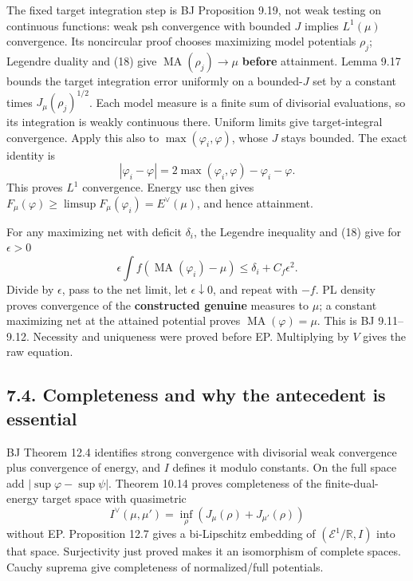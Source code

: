 \documentclass[
  11pt,
]{article}
\begin{document}
The fixed target integration step is BJ Proposition 9.19, not weak
testing on continuous functions: weak psh convergence with bounded \(J\)
implies \(L^1(\mu)\) convergence. Its noncircular proof chooses
maximizing model potentials \(\rho_j\); Legendre duality and (18) give
\(\operatorname{MA}(\rho_j)\to\mu\) \textbf{before} attainment. Lemma
9.17 bounds the target integration error uniformly on a bounded-\(J\)
set by a constant times \(J_\mu(\rho_j)^{1/2}\). Each model measure is a
finite sum of divisorial evaluations, so its integration is weakly
continuous there. Uniform limits give target-integral convergence. Apply
this also to \(\max(\varphi_i,\varphi)\), whose \(J\) stays bounded. The
exact identity is
\[|\varphi_i-\varphi|=2\max(\varphi_i,\varphi)-\varphi_i-\varphi.\] This
proves \(L^1\) convergence. Energy usc then gives
\(F_\mu(\varphi)\geq\limsup F_\mu(\varphi_i)=E^\vee(\mu)\), and hence
attainment.

For any maximizing net with deficit \(\delta_i\), the Legendre
inequality and (18) give for \(\epsilon>0\)
\[\epsilon\int f(\operatorname{MA}(\varphi_i)-\mu)
       \leq\delta_i+C_f\epsilon^2.\] Divide by \(\epsilon\), pass to the
net limit, let \(\epsilon\downarrow0\), and repeat with \(-f\). PL
density proves convergence of the \textbf{constructed genuine} measures
to \(\mu\); a constant maximizing net at the attained potential proves
\(\operatorname{MA}(\varphi)=\mu\). This is BJ 9.11--9.12. Necessity and
uniqueness were proved before EP. Multiplying by \(V\) gives the raw
equation.

\subsection{7.4. Completeness and why the antecedent is
essential}\label{completeness-and-why-the-antecedent-is-essential}

BJ Theorem 12.4 identifies strong convergence with divisorial weak
convergence plus convergence of energy, and \(I\) defines it modulo
constants. On the full space add \(|\sup\varphi-\sup\psi|\). Theorem
10.14 proves completeness of the finite-dual-energy target space with
quasimetric \[I^\vee(\mu,\mu')=\inf_\rho(J_\mu(\rho)+J_{\mu'}(\rho))\]
without EP. Proposition 12.7 gives a bi-Lipschitz embedding of
\((\mathcal E^1/\mathbb R,I)\) into that space. Surjectivity just proved
makes it an isomorphism of complete spaces. Cauchy suprema give
completeness of normalized/full potentials.
\end{document}
